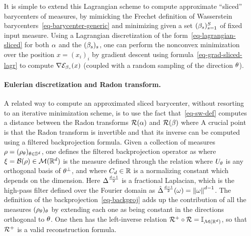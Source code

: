 It is simple to extend this Lagrangian scheme to compute approximate ``sliced'' barycenters  of measures, by mimicking the Frechet definition of Wasserstein barycenters~\eqref{eq-barycenter-generic} and minimizing 
given a set $(\beta_s)_{s=1}^S$ of fixed input measure. Using a Lagrangian discretization of the form~\eqref{eq-lagrangian-sliced} for both $\alpha$ and the $(\beta_s)_s$, one can perform the nonconvex minimization over the position $x=(x_i)_i$
by gradient descent using formula~\eqref{eq-grad-sliced-lagr} to compute $\nabla \mathcal{E}_{\beta_s}(x)$ (coupled with a random sampling of the direction $\theta$).




\paragraph{Eulerian discretization and Radon transform. }

A related way to compute an approximated sliced barycenter, without resorting to an iterative minimization scheme, is to use the fact that~\eqref{eq-sw-def} computes a distance between the Radon transforms $\mathcal{R}(\alpha)$ and $\mathcal{R}(\beta)$ where
A crucial point is that the Radon transform is invertible and that its inverse can be computed using a filtered backprojection formula. 
%
Given a collection of measures $\rho = (\rho_\theta)_{\theta \in \mathbb{S}^d}$, one defines the filtered  backprojection operator as
where $\xi = \mathcal{B}(\rho) \in \mathcal{M}(\mathbb{R}^d)$ is the measure defined through the relation 
where $U_\theta$ is any orthogonal basis of $\theta^\bot$, 
and where $C_d \in \mathbb{R}$ is a normalizing constant which depends on the dimension.
%
Here $\Delta^{\frac{d-1}{2}}$ is a fractional Laplacian, which is the high-pass filter defined over the Fourier domain as 
$\hat {\Delta}^{\frac{d-1}{2}}(\omega) = \left\| \omega \right\|^{d-1}$.
%
The definition of the backprojection~\eqref{eq-backproj} adds up the contribution of all the measures $(\rho_\theta)_\theta$ by extending each one as being constant in the directions orthogonal to $\theta$.
%
One then has the left-inverse relation $\mathcal{R}^+ \circ \mathcal{R} = \mathbb{I}_{\mathcal{M}(\mathbb{R}^d)}$, so that $\mathcal{R}^+$ is a valid reconstruction formula. 


